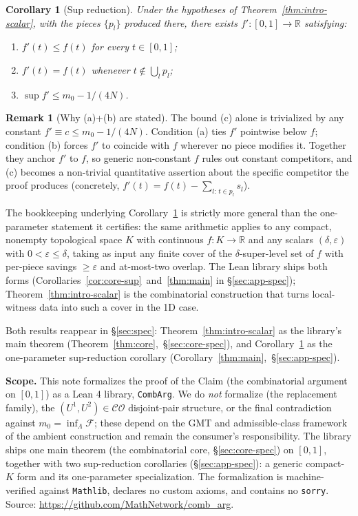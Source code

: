 \documentclass[11pt,reqno]{amsart}
\newtheorem{corollary}[theorem]{Corollary}
\theoremstyle{definition}
\newtheorem{remark}[theorem]{Remark}
\newcommand{\CombArg}{\texttt{CombArg}}
\newcommand{\Mathlib}{\texttt{Mathlib}}
\begin{document}
\begin{corollary}[Sup reduction]
\label{thm:intro-core}
Under the hypotheses of Theorem~\ref{thm:intro-scalar}, with the
pieces $\{p_l\}$ produced there, there exists
$f' : [0,1] \to \mathbb{R}$ satisfying:
\begin{enumerate}
\item[\textup{(a)}] $f'(t) \le f(t)$ for every $t \in [0,1]$;
\item[\textup{(b)}] $f'(t) = f(t)$ whenever $t \notin \bigcup_l p_l$;
\item[\textup{(c)}] $\sup f' \le m_0 - 1/(4N)$.
\end{enumerate}
\end{corollary}

\begin{remark}[Why (a)+(b) are stated]
\label{rem:anchor-f-prime}
The bound (c) alone is trivialized by any constant
$f' \equiv c \le m_0 - 1/(4N)$. Condition (a) ties $f'$
pointwise below $f$; condition (b) forces $f'$ to coincide with
$f$ wherever no piece modifies it. Together they anchor $f'$ to
$f$, so generic non-constant $f$ rules out constant competitors,
and (c) becomes a non-trivial quantitative assertion about the
specific competitor the proof produces
(concretely, $f'(t) = f(t) - \sum_{l :\, t \in p_l} s_l$).
\end{remark}

The bookkeeping underlying Corollary~\ref{thm:intro-core} is
strictly more general than the one-parameter statement it
certifies: the same arithmetic applies to any compact, nonempty
topological space $K$ with continuous $f : K \to \mathbb{R}$ and
any scalars $(\delta, \varepsilon)$ with
$0 < \varepsilon \le \delta$, taking as input any finite cover of
the $\delta$-super-level set of $f$ with per-piece savings $\ge
\varepsilon$ and at-most-two overlap. The Lean library ships
both forms (Corollaries~\ref{cor:core-sup}~and~\ref{thm:main} in
\S\ref{sec:app-spec}); Theorem~\ref{thm:intro-scalar} is the
combinatorial construction that turns local-witness data into
such a cover in the 1D case.

Both results reappear in §\ref{sec:spec}:
Theorem~\ref{thm:intro-scalar} as the library's main theorem
(Theorem~\ref{thm:core},~\S\ref{sec:core-spec}), and
Corollary~\ref{thm:intro-core} as the one-parameter sup-reduction
corollary (Corollary~\ref{thm:main},~\S\ref{sec:app-spec}).

\textbf{Scope.} This note formalizes the proof of the Claim
(the combinatorial argument on $[0,1]$) as a Lean 4 library,
\CombArg. We do \emph{not}
formalize \cite[Lemma~3.1]{DLT13} (the replacement family), the
$(U^1, U^2) \in \mathcal{CO}$ disjoint-pair structure, or the
final contradiction against $m_0 = \inf_\Lambda \mathcal{F}$;
these depend on the GMT and admissible-class framework of the
ambient construction and remain the consumer's responsibility.
The library ships one main theorem (the combinatorial core,
§\ref{sec:core-spec}) on $[0,1]$, together with two
sup-reduction corollaries (§\ref{sec:app-spec}): a generic
compact-$K$ form and its one-parameter specialization. The
formalization is machine-verified against \Mathlib, declares no
custom axioms, and contains no \texttt{sorry}. Source:
\url{https://github.com/MathNetwork/comb_arg}.
\end{document}

